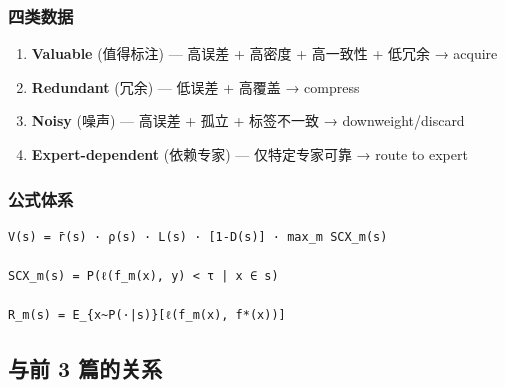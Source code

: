 \documentclass[
  12pt,
]{ctexart}
\providecommand{\tightlist}{%
  \setlength{\itemsep}{0pt}\setlength{\parskip}{0pt}}
\begin{document}
\subsubsection{四类数据}\label{ux56dbux7c7bux6570ux636e}

\begin{enumerate}
\def\labelenumi{\arabic{enumi}.}
\tightlist
\item
  \textbf{Valuable} (值得标注) --- 高误差 + 高密度 + 高一致性 + 低冗余 →
  acquire
\item
  \textbf{Redundant} (冗余) --- 低误差 + 高覆盖 → compress
\item
  \textbf{Noisy} (噪声) --- 高误差 + 孤立 + 标签不一致 →
  downweight/discard
\item
  \textbf{Expert-dependent} (依赖专家) --- 仅特定专家可靠 → route to
  expert
\end{enumerate}

\subsubsection{公式体系}\label{ux516cux5f0fux4f53ux7cfb}

\begin{verbatim}
V(s) = r̄(s) · ρ(s) · L(s) · [1-D(s)] · max_m SCX_m(s)

SCX_m(s) = P(ℓ(f_m(x), y) < τ | x ∈ s)

R_m(s) = E_{x~P(·|s)}[ℓ(f_m(x), f*(x))]
\end{verbatim}

\subsection{与前 3
篇的关系}\label{ux4e0eux524d-3-ux7bc7ux7684ux5173ux7cfb}
\end{document}
